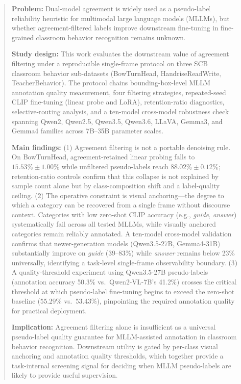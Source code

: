 \documentclass{ieeeaccess}
\begin{document}
\begin{abstract}
\textbf{Problem:} Dual-model agreement is widely used as a pseudo-label
reliability heuristic for multimodal large language models (MLLMs), but
whether agreement-filtered labels improve downstream fine-tuning in
fine-grained classroom behavior recognition remains unknown.

\textbf{Study design:} This work evaluates the downstream value of
agreement filtering under a reproducible single-frame protocol on three
SCB classroom behavior sub-datasets (BowTurnHead, HandriseReadWrite,
TeacherBehavior). The protocol chains bounding-box-level MLLM annotation
quality measurement, four filtering strategies, repeated-seed CLIP
fine-tuning (linear probe and LoRA), retention-ratio diagnostics,
selective-routing analysis, and a ten-model cross-model robustness check
spanning Qwen2, Qwen2.5, Qwen3.5, Qwen3.6, LLaVA, Gemma3, and Gemma4
families across 7B--35B parameter scales.

\textbf{Main findings:} (1) Agreement filtering is not a portable
denoising rule. On BowTurnHead, agreement-retained linear probing falls
to $15.53\% \pm 1.00\%$ while unfiltered pseudo-labels reach
$88.02\% \pm 0.12\%$; retention-ratio controls confirm that this
collapse is not explained by sample count alone but by class-composition
shift and a label-quality ceiling. (2) The operative constraint is visual
anchoring---the degree to which a category can be recovered from a single
frame without discourse context. Categories with low zero-shot CLIP
accuracy (e.g., \textit{guide}, \textit{answer}) systematically fail
across all tested MLLMs, while visually anchored categories remain
reliably annotated. A ten-model cross-model validation confirms that
newer-generation models (Qwen3.5-27B, Gemma4-31B) substantially improve
on \textit{guide} (39--83\%) while \textit{answer} remains below 23\%
universally, identifying a task-level single-frame observability
boundary. (3) A quality-threshold experiment using Qwen3.5-27B
pseudo-labels (annotation accuracy 50.3\% vs.\ Qwen2-VL-7B's 41.2\%)
crosses the critical threshold at which pseudo-label fine-tuning begins
to exceed the zero-shot baseline ($55.29\%$ vs.\ $53.43\%$), pinpointing
the required annotation quality for practical deployment.

\textbf{Implication:} Agreement filtering alone is insufficient as a
universal pseudo-label quality guarantee for MLLM-assisted annotation in
classroom behavior recognition. Downstream utility is gated by per-class
visual anchoring and annotation quality thresholds, which together
provide a task-internal screening signal for deciding when MLLM
pseudo-labels are likely to provide useful supervision.
\end{abstract}
\end{document}
